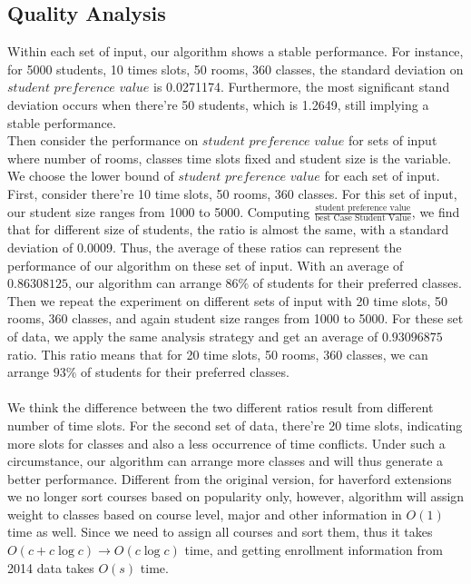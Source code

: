 \documentclass[11pt, oneside]{article}   	%
\begin{document}
\subsection{Quality Analysis}
Within each set of input, our algorithm shows a stable performance. For instance, for 5000 students, 10 times slots, 50 rooms, 360 classes, the standard deviation on $student$  $preference$  $value$ is 0.0271174. Furthermore, the most significant stand deviation occurs when there're 50 students, which is 1.2649, still implying a stable performance. 
\\Then consider the performance on $student$ $preference$ $value$ for sets of input where number of rooms, classes time slots fixed and student size is the variable. We choose the lower bound of $student$ $preference$ $value$ for each set of input. First, consider there're 10 time slots, 50 rooms, 360 classes. For this set of input, our student size ranges from 1000 to 5000. Computing $\frac{\text{student preference value}}{\text{best Case Student Value}}$, we find that for different size of students, the ratio is almost the same, with a standard deviation of 0.0009. Thus, the average of these ratios can represent the performance of our algorithm on these set of input. With an average of $0.86308125$, our algorithm can arrange $86\%$ of students for their preferred classes. Then we repeat the experiment on different sets of input with 20 time slots, 50 rooms, 360 classes, and again student size ranges from 1000 to 5000. For these set of data, we apply the same analysis strategy and get an average of $0.93096875$ ratio. This ratio means that for 20 time slots, 50 rooms, 360 classes, we can arrange $93\%$ of students for their preferred classes.\\
\\We think the difference between the two different ratios result from different number of time slots. For the second set of data, there're 20 time slots, indicating more slots for classes and also a less occurrence of time conflicts. Under such a circumstance, our algorithm can arrange more classes and will thus generate a better performance.
Different from the original version, for haverford extensions we no longer sort courses based on popularity only, however, algorithm will assign weight to classes based on course level, major and other information in $O(1)$ time as well. Since we need to assign all courses and sort them, thus it takes $O(c+c\log c) \to O(c\log c)$ time, and getting enrollment information from 2014 data takes $O(s)$ time.\\
\end{document}
